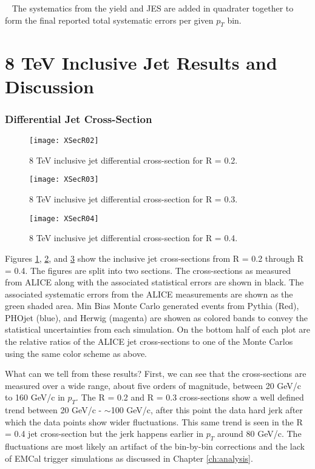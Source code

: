\
\newline
The systematics from the yield and JES are added in quadrater together to form the final reported total systematic errors per given $p_{T}$ bin.
\newpage

\section{8 TeV Inclusive Jet Results and Discussion}

\subsubsection{Differential Jet Cross-Section}

\begin{figure}[h]
\texttt{[image: XSecR02]}
\centering
\caption{8 TeV inclusive jet differential cross-section for R = 0.2.}
\label{fig:JetXsecR02}
\end{figure}

\begin{figure}[h]
\texttt{[image: XSecR03]}
\centering
\caption{8 TeV inclusive jet differential cross-section for R = 0.3.}
\label{fig:JetXsecR03}
\end{figure}

\begin{figure}[h]
\texttt{[image: XSecR04]}
\centering
\caption{8 TeV inclusive jet differential cross-section for R = 0.4.}
\label{fig:JetXsecR04}
\end{figure}

Figures \ref{fig:JetXsecR02}, \ref{fig:JetXsecR03}, and \ref{fig:JetXsecR04} show the inclusive jet cross-sections from R = 0.2 through R = 0.4.  The figures are split into two sections.  The cross-sections as measured from ALICE along with the associated statistical errors are shown in black.  The associated systematic errors from the ALICE measurements are shown as the green shaded area.  Min Bias Monte Carlo generated events from Pythia (Red), PHOjet (blue), and Herwig (magenta) are showen as colored bands to convey the statistical uncertainties from each simulation.  On the bottom half of each plot are the relative ratios of the ALICE jet cross-sections to one of the Monte Carlos using the same color scheme as above.  

What can we tell from these results?  First, we can see that the cross-sections are measured over a wide range, about five orders of magnitude, between 20 GeV/c to 160 GeV/c in $p_{T}$.  The R = 0.2 and R = 0.3 cross-sections show a well defined trend between 20 GeV/c - $\sim$100 GeV/c, after this point the data hard jerk after which the data points show wider fluctuations.  This same trend is seen in the R = 0.4 jet cross-section but the jerk happens earlier in $p_{T}$ around  80 GeV/c.  The fluctuations are most likely an artifact of the bin-by-bin corrections and the lack of EMCal trigger simulations as discussed in Chapter \ref{ch:analysis}.  

